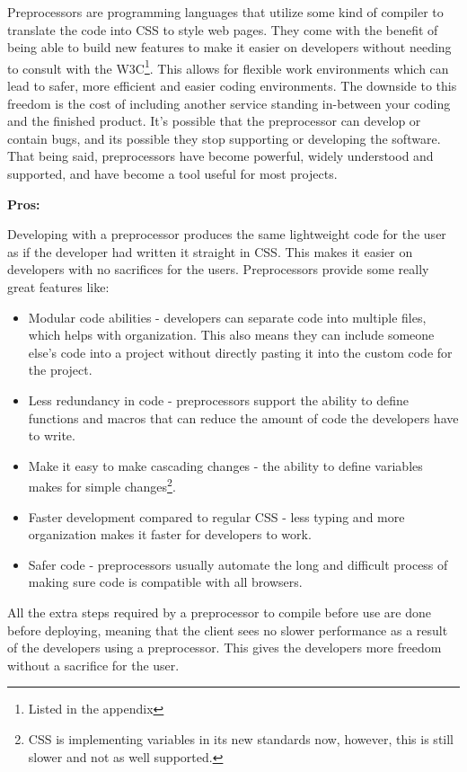\documentclass[draftclsnofoot,onecolumn,letterpaper,10pt,compsoc]{IEEEtran}
\begin{document}
    Preprocessors are programming languages that utilize some kind of compiler to translate the code into CSS to style web pages.
    They come with the benefit of being able to build new features to make it easier on developers without needing to consult with the W3C\footnote{Listed in the appendix}.
    This allows for flexible work environments which can lead to safer, more efficient and easier coding environments.
    The downside to this freedom is the cost of including another service standing in-between your coding and the finished product.
    It's possible that the preprocessor can develop or contain bugs, and its possible they stop supporting or developing the software.
    That being said, preprocessors have become powerful, widely understood and supported, and have become a tool useful for most projects.

    \noindent \textbf{Pros:}

    Developing with a preprocessor produces the same lightweight code for the user as if the developer had written it straight in CSS. This makes it easier on developers with no sacrifices for the users. Preprocessors provide some really great features like:
    \begin{itemize}
      \item Modular code abilities - developers can separate code into multiple files, which helps with organization. This also means they can include someone else's code into a project without directly pasting it into the custom code for the project.\cite{sass}
      \item Less redundancy in code - preprocessors support the ability to define functions and macros that can reduce the amount of code the developers have to write.
      \item Make it easy to make cascading changes - the ability to define variables makes for simple changes\footnote{CSS is implementing variables in its new standards now, however, this is still slower and not as well supported.}.
      \item Faster development compared to regular CSS - less typing and more organization makes it faster for developers to work.\cite{sass}
      \item Safer code - preprocessors usually automate the long and difficult process of making sure code is compatible with all browsers.
    \end{itemize}

    All the extra steps required by a preprocessor to compile before use are done before deploying, meaning that the client sees no slower performance as a result of the developers using a preprocessor.
    This gives the developers more freedom without a sacrifice for the user.
\end{document}
